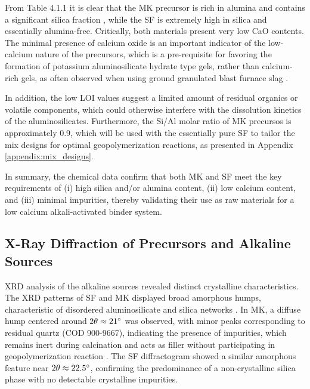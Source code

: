 From Table 4.1.1 it is clear that the MK precursor is rich in alumina and contains a significant silica fraction , while the SF is extremely high in silica and essentially alumina-free.
Critically, both materials present very low CaO contents.
The minimal presence of calcium oxide is an important indicator of the low-calcium nature of the precursors, which is a pre-requisite for favoring the formation of potassium aluminosilicate hydrate type gels, rather than calcium-rich gels, as often observed when using ground granulated blast furnace slag \cite{ali2023geopolymer}.


In addition, the low LOI values suggest a limited amount of residual organics or volatile components, which could otherwise interfere with the dissolution kinetics of the aluminosilicates.
Furthermore, the Si/Al molar ratio of MK precursos is approximately 0.9, which will be used with the essentially pure SF to tailor the mix designs for optimal geopolymerization reactions, as presented in Appendix \ref{appendix:mix_designs}.

In summary, the chemical data confirm that both MK and SF meet the key requirements of (i) high silica and/or alumina content, (ii) low calcium content, and (iii) minimal impurities, thereby validating their use as raw materials for a low calcium alkali-activated binder system.

\subsection{X-Ray Diffraction of Precursors and Alkaline Sources}
\label{sec:x-ray_diffraction_of_precursors_and_alkaline_sources}

XRD analysis of the alkaline sources revealed distinct crystalline characteristics.
The XRD patterns of SF and MK displayed broad amorphous humps, characteristic of disordered aluminosilicate and silica networks \cite{provis2009geopolymers,ke2021one}.
In MK, a diffuse hump centered around $2\theta \approx 21^{\circ}$ was observed, with minor peaks corresponding to residual quartz (COD 900-9667), indicating the presence of impurities, which remains inert during calcination \cite{provis2014geopolymers} and acts as filler without participating in geopolymerization reaction \cite{rakhimova2019metakaolin}.
The SF diffractogram showed a similar amorphous feature near $2\theta \approx 22.5^{\circ}$, confirming the predominance of a non-crystalline silica phase with no detectable crystalline impurities.

